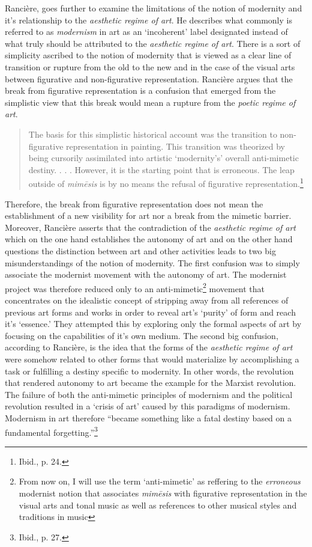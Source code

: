 Ranci\`{e}re, goes further to examine the limitations of the notion of modernity and it's relationship to the \emph{aesthetic regime of art}. He describes what commonly is referred to as \emph{modernism} in art as an `incoherent' label designated instead of what truly should be attributed to the \emph{aesthetic regime of art}. There is a sort of simplicity ascribed to the notion of modernity that is viewed as a clear line of transition or rupture from the old to the new and in the case of the visual arts between figurative and non-figurative representation. Ranci\`{e}re argues that the break from figurative representation is a confusion that emerged from the simplistic view that this break would mean a rupture from the \emph{poetic regime of art}.

\begin{quote}
The basis for this simplistic historical account was the transition to non-figurative representation in painting. This transition was theorized by being cursorily assimilated into artistic `modernity's' overall anti-mimetic destiny. . . . However, it is the starting point that is erroneous. The leap outside of \emph{mim\={e}sis} is by no means the refusal of figurative representation.\footnote{Ibid., p. 24.}
\end{quote}

Therefore, the break from figurative representation does not mean the establishment of a new visibility for art nor a break from the mimetic barrier. Moreover, Ranci\`{e}re asserts that the contradiction of the \emph{aesthetic regime of art} which on the one hand establishes the autonomy of art and on the other hand questions the distinction between art and other activities leads to two big misunderstandings of the notion of modernity. The first confusion was to simply associate the modernist movement with the autonomy of art. The modernist project was therefore reduced only to an anti-mimetic\footnote{From now on, I will use the term `anti-mimetic' as reffering to the \emph{erroneous} modernist notion that associates \emph{mim\={e}sis} with figurative representation in the visual arts and tonal music as well as references to other musical styles and traditions in music} movement that concentrates on the idealistic concept of stripping away from all references of previous art forms and works in order to reveal art's `purity' of form and reach it's `essence.' They attempted this by exploring only the formal aspects of art by focusing on the capabilities of it's own medium. The second big confusion, according to Ranci\`{e}re, is the idea that the forms of the \emph{aesthetic regime of art} were somehow related to other forms that would materialize by accomplishing a task or fulfilling a destiny specific to modernity. In other words, the revolution that rendered autonomy to art became the example for the Marxist revolution. The failure of both the anti-mimetic principles of modernism and the political revolution resulted in a `crisis of art' caused by this paradigms of modernism. Modernism in art therefore ``became something like a fatal destiny based on a fundamental forgetting.''\footnote{Ibid., p. 27.} 

